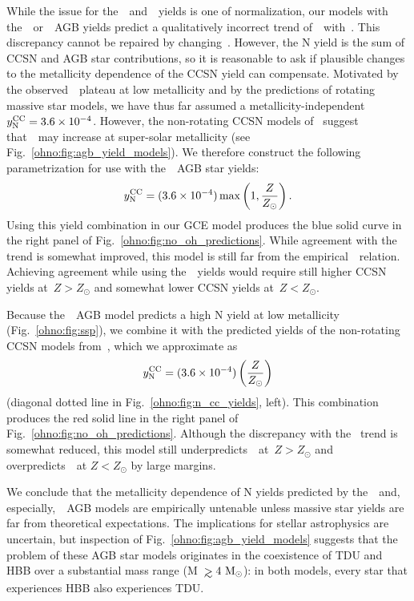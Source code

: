 While the issue for the~\cristallo~and~\ventura~yields is one of normalization,
our models with the~\karakasten~or~\karakas~AGB yields predict a
qualitatively incorrect trend of~\no~with~\oh.
This discrepancy cannot be repaired by changing~.
However, the N yield is the sum of CCSN and AGB star contributions, so it is
reasonable to ask if plausible changes to the metallicity dependence of the
CCSN yield can compensate.
Motivated by the observed~\no~plateau at low metallicity and by the predictions
of rotating massive star models, we have thus far assumed a
metallicity-independent~$y_\text{N}^\text{CC} = 3.6\times10^{-4}$.
However, the non-rotating CCSN models of~\citet{Nomoto2013} suggest
that~~may increase at super-solar metallicity (see
Fig.~\ref{ohno:fig:agb_yield_models}).
We therefore construct the following parametrization for use with
the~\karakas~AGB star yields:
\begin{equation}
y_\text{N}^\text{CC} = (3.6\times10^{-4})\max\left(1, \frac{Z}{Z_\odot}\right).
\label{ohno:eq:broken_yncc}
\end{equation}
Using this yield combination in our GCE model produces the blue solid curve
in the right panel of Fig.~\ref{ohno:fig:no_oh_predictions}.
While agreement with the~\citet{Dopita2016} trend is somewhat improved, this
model is still far from the empirical~\ohno~relation.
Achieving agreement while using the~\karakas~yields would require still higher
CCSN yields at~$Z > Z_\odot$ and somewhat lower CCSN yields at~$Z < Z_\odot$.
\par
Because the~\karakasten~AGB model predicts a high N yield at low metallicity
(Fig.~\ref{ohno:fig:ssp}), we combine it with the predicted yields of the
non-rotating CCSN models from~\citet{Limongi2018}, which we approximate as
\begin{equation}
y_\text{N}^\text{CC} = (3.6\times10^{-4})\left(\frac{Z}{Z_\odot}\right)
\label{ohno:eq:linear_yncc}
\end{equation}
(diagonal dotted line in Fig.~\ref{ohno:fig:n_cc_yields}, left).
This combination produces the red solid line in the right panel of
Fig.~\ref{ohno:fig:no_oh_predictions}.
Although the discrepancy with the~\citet{Dopita2016} trend is somewhat reduced,
this model still underpredicts~\no~at~$Z > Z_\odot$ and overpredicts~\no~at
$Z < Z_\odot$ by large margins.
\par
We conclude that the metallicity dependence of N yields predicted by
the~\karakas~and, especially,~\karakasten~AGB models are empirically
untenable unless massive star yields are far from theoretical expectations.
The implications for stellar astrophysics are uncertain, but inspection of
Fig.~\ref{ohno:fig:agb_yield_models} suggests that the problem of these AGB star
models originates in the coexistence of TDU and HBB over a substantial
mass range (M~$\gtrsim 4~\msun$): in both models, every star that experiences
HBB also experiences TDU.

